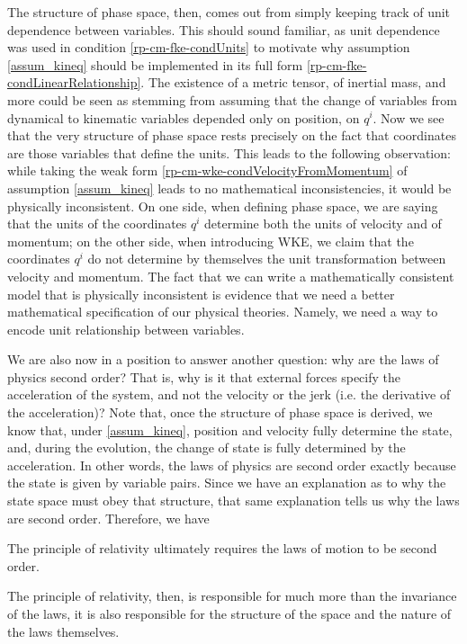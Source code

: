 The structure of phase space, then, comes out from simply keeping track of unit dependence between variables. This should sound familiar, as unit dependence was used in condition \ref{rp-cm-fke-condUnits} to motivate why assumption \ref{assum_kineq} should be implemented in its full form \ref{rp-cm-fke-condLinearRelationship}. The existence of a metric tensor, of inertial mass, and more could be seen as stemming from assuming that the change of variables from dynamical to kinematic variables depended only on position, on $q^i$. Now we see that the very structure of phase space rests precisely on the fact that coordinates are those variables that define the units. This leads to the following observation: while taking the weak form \ref{rp-cm-wke-condVelocityFromMomentum} of assumption \ref{assum_kineq} leads to no mathematical inconsistencies, it would be physically inconsistent. On one side, when defining phase space, we are saying that the units of the coordinates $q^i$ determine both the units of velocity and of momentum; on the other side, when introducing WKE, we claim that  the coordinates $q^i$ do not determine by themselves the unit transformation between velocity and momentum. The fact that we can write a mathematically consistent model that is physically inconsistent is evidence that we need a better mathematical specification of our physical theories. Namely, we need a way to encode unit relationship between variables.

We are also now in a position to answer another question: why are the laws of physics second order? That is, why is it that external forces specify the acceleration of the system, and not the velocity or the jerk (i.e. the derivative of the acceleration)? Note that, once the structure of phase space is derived, we know that, under \ref{assum_kineq}, position and velocity fully determine the state, and, during the evolution, the change of state is fully determined by the acceleration. In other words, the laws of physics are second order exactly because the state is given by variable pairs. Since we have an explanation as to why the state space must obey that structure, that same explanation tells us why the laws are second order. Therefore, we have
\begin{insight}
	The principle of relativity ultimately requires the laws of motion to be second order.
\end{insight}
The principle of relativity, then, is responsible for much more than the invariance of the laws, it is also responsible for the structure of the space and the nature of the laws themselves.

